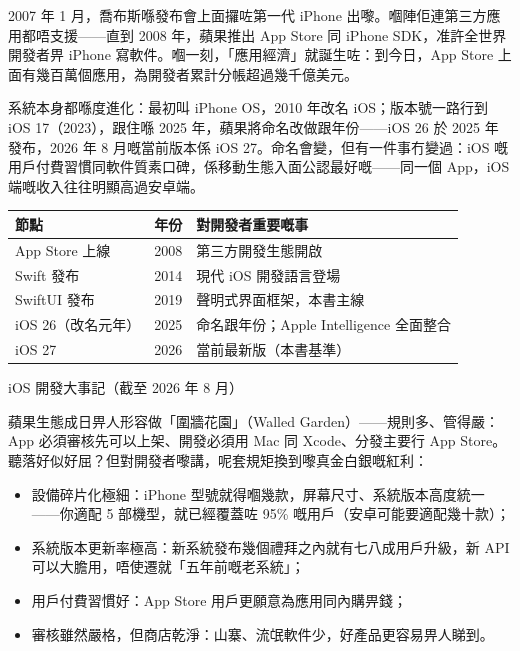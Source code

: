 


2007 年 1 月，喬布斯喺發布會上面攞咗第一代 iPhone 出嚟。嗰陣佢連第三方應用都唔支援——直到 2008 年，蘋果推出 App Store 同 iPhone SDK，准許全世界開發者畀 iPhone 寫軟件。嗰一刻，「應用經濟」就誕生咗：到今日，App Store 上面有幾百萬個應用，為開發者累計分帳超過幾千億美元。

系統本身都喺度進化：最初叫 iPhone OS，2010 年改名 iOS；版本號一路行到 iOS 17（2023），跟住喺 2025 年，蘋果將命名改做跟年份——iOS 26 於 2025 年發布，2026 年 8 月嘅當前版本係 iOS 27。命名會變，但有一件事冇變過：iOS 嘅用戶付費習慣同軟件質素口碑，係移動生態入面公認最好嘅——同一個 App，iOS 端嘅收入往往明顯高過安卓端。

\begin{center}
\begin{tabularx}{\linewidth}{|X|X|X|}
\hline
\textbf{節點} & \textbf{年份} & \textbf{對開發者重要嘅事} \tabularnewline
\hline
App Store 上線 & 2008 & 第三方開發生態開啟 \tabularnewline
Swift 發布 & 2014 & 現代 iOS 開發語言登場 \tabularnewline
SwiftUI 發布 & 2019 & 聲明式界面框架，本書主線 \tabularnewline
iOS 26（改名元年） & 2025 & 命名跟年份；Apple Intelligence 全面整合 \tabularnewline
iOS 27 & 2026 & 當前最新版（本書基準） \tabularnewline
\hline
\end{tabularx}
\end{center}

\begin{center}\small\color{gray}iOS 開發大事記（截至 2026 年 8 月）\end{center}


蘋果生態成日畀人形容做「圍牆花園」（Walled Garden）——規則多、管得嚴：App 必須審核先可以上架、開發必須用 Mac 同 Xcode、分發主要行 App Store。聽落好似好屈？但對開發者嚟講，呢套規矩換到嚟真金白銀嘅紅利：

\begin{itemize}
  \item 設備碎片化極細：iPhone 型號就得嗰幾款，屏幕尺寸、系統版本高度統一——你適配 5 部機型，就已經覆蓋咗 95\% 嘅用戶（安卓可能要適配幾十款）；
  \item 系統版本更新率極高：新系統發布幾個禮拜之內就有七八成用戶升級，新 API 可以大膽用，唔使遷就「五年前嘅老系統」；
  \item 用戶付費習慣好：App Store 用戶更願意為應用同內購畀錢；
  \item 審核雖然嚴格，但商店乾淨：山寨、流氓軟件少，好產品更容易畀人睇到。
\end{itemize}

